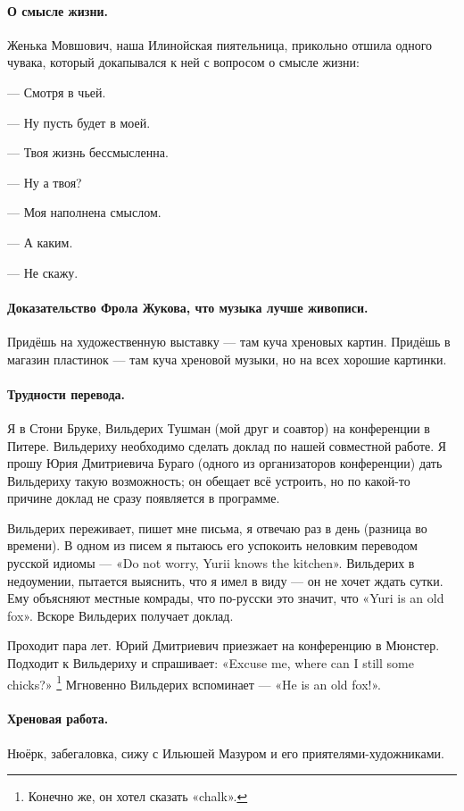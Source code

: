 \documentclass{book}
\begin{document}
\paragraph{О смысле жизни.}
Женька Мовшович, наша Илинойская пиятельница, прикольно отшила одного чувака, который докапывался к ней с вопросом о смысле жизни:

--- Смотря в чьей.

--- Ну пусть будет в моей.

--- Твоя жизнь бессмысленна.

--- Ну а твоя?

--- Моя наполнена смыслом.

--- А каким.

--- Не скажу.

\paragraph{Доказательство Фрола Жукова, что музыка лучше живописи.}
Придёшь на художественную выставку --- там куча хреновых картин.
Придёшь в магазин пластинок --- там куча хреновой музыки, но на всех хорошие картинки.

\paragraph{Трудности перевода.}
Я в Стони Бруке, Вильдерих Тушман (мой друг и соавтор) на конференции в Питере.
Вильдериху необходимо сделать доклад по нашей совместной работе.
Я прошу Юрия Дмитриевича Бураго (одного из организаторов конференции) дать Вильдериху такую возможность;
он обещает всё устроить, но по какой-то причине доклад не сразу появляется в программе.

Вильдерих переживает, пишет мне письма, я отвечаю раз в день (разница во времени).
В одном из писем я пытаюсь его успокоить неловким переводом русской идиомы --- «Do not worry, Yurii knows the kitchen».
Вильдерих в недоумении, пытается выяснить, что я имел в виду --- он не хочет ждать сутки.
Ему объясняют местные комрады, что по-русски это значит, что «Yuri is an old fox».
Вскоре Вильдерих получает доклад.

Проходит пара лет.
Юрий Дмитриевич приезжает на конференцию в Мюнстер.
Подходит к Вильдериху и спрашивает: «Excuse me, where can I still some chicks?»%
\footnote{Конечно же, он хотел сказать «chalk».}
Мгновенно Вильдерих вспоминает --- «He is an old fox!».

\paragraph{Хреновая работа.}
Нюёрк, забегаловка, сижу с Ильюшей Мазуром и его приятелями-художниками.
\end{document}
